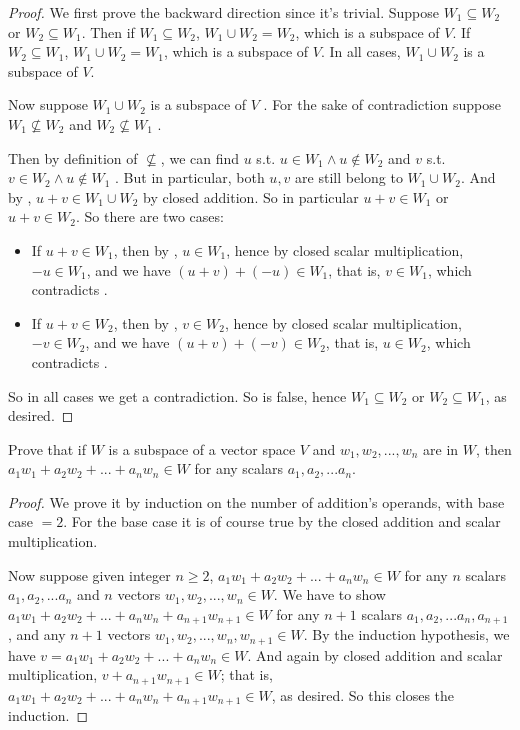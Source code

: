 \begin{proof}
We first prove the backward direction since it's trivial.
Suppose \(W_1 \subseteq W_2\) or \(W_2 \subseteq W_1\).
Then if \(W_1 \subseteq W_2\), \(W_1 \cup W_2 = W_2\), which is a subspace of \(V\).
If \(W_2 \subseteq W_1\), \(W_1 \cup W_2 = W_1\), which is a subspace of \(V\).
In all cases, \(W_1 \cup W_2\) is a subspace of \(V\).

Now suppose \(W_1 \cup W_2\) is a subspace of \(V\) .
For the sake of contradiction suppose \(W_1 \not \subseteq W_2\) and \(W_2 \not \subseteq W_1\) .

Then by definition of \(\not \subseteq\), we can find \(u\) s.t. \(u \in W_1 \land u \not \in W_2\)  and \(v\) s.t. \(v \in W_2 \land u \not \in W_1\) .
But in particular, both \(u, v\) are still belong to \(W_1 \cup W_2\).
And by , \(u + v \in W_1 \cup W_2\) by closed addition.
So in particular \(u + v \in W_1\) or \(u + v \in W_2\).
So there are two cases:
\begin{itemize}
    \item If \(u + v \in W_1\), then by , \(u \in W_1\), hence by closed scalar multiplication, \(-u \in W_1\), and we have \((u + v) + (-u) \in W_1\), that is, \(v \in W_1\), which contradicts .
    \item If \(u + v \in W_2\), then by , \(v \in W_2\), hence by closed scalar multiplication, \(-v \in W_2\), and we have \((u + v) + (-v) \in W_2\), that is, \(u \in W_2\), which contradicts .
\end{itemize}
So in all cases we get a contradiction.
So  is false, hence \(W_1 \subseteq W_2\) or \(W_2 \subseteq W_1\), as desired.
\end{proof}

\begin{exercise} \label{exercise 1.3.20}
Prove that if \(W\) is a subspace of a vector space \(V\) and \(w_1, w_2, ..., w_n\) are in \(W\), then \(a_1 w_1 + a_2 w_2 + ... + a_n w_n \in W\) for any scalars \(a_1, a_2, ... a_n\).
\end{exercise}

\begin{proof}
We prove it by induction on the number of addition's operands, with base case \(= 2\).
For the base case it is of course true by the closed addition and scalar multiplication.

Now suppose given integer \(n \ge 2\), \(a_1 w_1 + a_2 w_2 + ... + a_n w_n \in W\) for any \(n\) scalars \(a_1, a_2, ... a_n\) and \(n\) vectors \(w_1, w_2, ..., w_n \in W\).
We have to show \(a_1 w_1 + a_2 w_2 + ... + a_n w_n + a_{n + 1} w_{n + 1} \in W\) for any \(n + 1\) scalars \(a_1, a_2, ... a_n, a_{n + 1}\),
and any \(n + 1\) vectors \(w_1, w_2, ..., w_n, w_{n + 1} \in W\).
By the induction hypothesis, we have \(v = a_1 w_1 + a_2 w_2 + ... + a_n w_n \in W\).
And again by closed addition and scalar multiplication, \(v + a_{n + 1} w_{n + 1} \in W\);
that is, \(a_1 w_1 + a_2 w_2 + ... + a_n w_n + a_{n + 1} w_{n + 1} \in W\), as desired.
So this closes the induction.
\end{proof}

